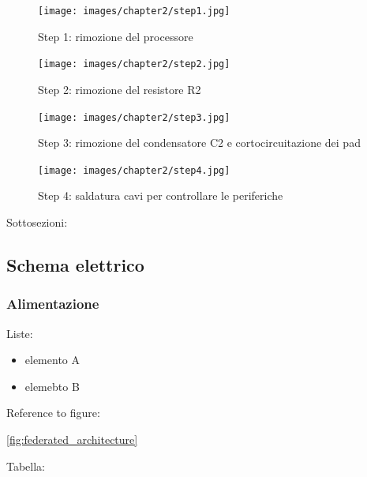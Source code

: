 \begin{figure}[H]
    \centering
    \begin{minipage}[b]{0.45\textwidth}
      \texttt{[image: images/chapter2/step1.jpg]}
      \caption{Step 1: rimozione del processore}
      \label{fig:step1}
    \end{minipage}
    \hfill
    \begin{minipage}[b]{0.45\textwidth}
      \texttt{[image: images/chapter2/step2.jpg]}
      \caption{Step 2: rimozione del resistore R2}
      \label{fig:step2}
      \end{minipage}
  \end{figure}
  
  \begin{figure}[H]
    \centering
    \begin{minipage}[b]{0.45\textwidth}
      \texttt{[image: images/chapter2/step3.jpg]}
      \caption{Step 3: rimozione del condensatore C2 e cortocircuitazione dei pad}
      \label{fig:step2}  
    \end{minipage}
    \hfill
    \begin{minipage}[b]{0.45\textwidth}
      \texttt{[image: images/chapter2/step4.jpg]}
      \caption{Step 4: saldatura cavi per controllare le periferiche}
      \label{fig:step2}
        \end{minipage}
\end{figure}

Sottosezioni:

\subsection{Schema elettrico}

\subsubsection{Alimentazione}

Liste:

\begin{itemize}
    \item elemento A
    \item elemebto B
\end{itemize}


Reference to figure:

\ref{fig:federated_architecture}


Tabella:

